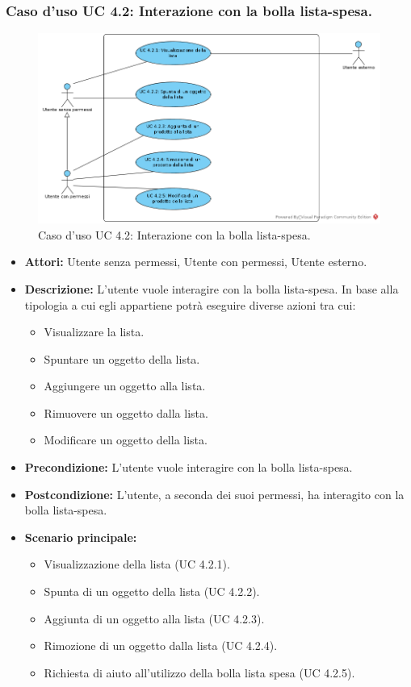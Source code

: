 \newpage
\subsubsection{Caso d'uso UC 4.2: Interazione con la bolla lista-spesa.}
\label{Caso d'uso UC 4.2: Interazione con la bolla lista-spesa.}
\begin{figure}[ht]
	\centering
	\includegraphics[scale=0.60]{Usecases/img/UC4.2.png}
	\caption{Caso d'uso UC 4.2: Interazione con la bolla lista-spesa.}
\end{figure}

\FloatBarrier
\begin{itemize}
\item \textbf{Attori:} Utente senza permessi, Utente con permessi, Utente esterno.
\item \textbf{Descrizione:} L'utente vuole interagire con la bolla lista-spesa. In base alla tipologia a cui egli appartiene potrà eseguire diverse azioni tra cui:
\begin{itemize}
\item Visualizzare la lista.
\item Spuntare un oggetto della lista.
\item Aggiungere un oggetto alla lista.
\item Rimuovere un oggetto dalla lista.
\item Modificare un oggetto della lista.
\end{itemize}
\item \textbf{Precondizione:} L'utente vuole interagire con la bolla lista-spesa. 
\item \textbf{Postcondizione:} L'utente, a seconda dei suoi permessi, ha interagito con la bolla lista-spesa.
\item \textbf{Scenario principale:}
	\begin{itemize}
	\item{Visualizzazione della lista (UC 4.2.1).}
	\item{Spunta di un oggetto della lista (UC 4.2.2).}
	\item{Aggiunta di un oggetto alla lista (UC 4.2.3).}
	\item{Rimozione di un oggetto dalla lista (UC 4.2.4).}
	\item{Richiesta di aiuto all'utilizzo della bolla lista spesa (UC 4.2.5).}
	\end{itemize}
\end{itemize}